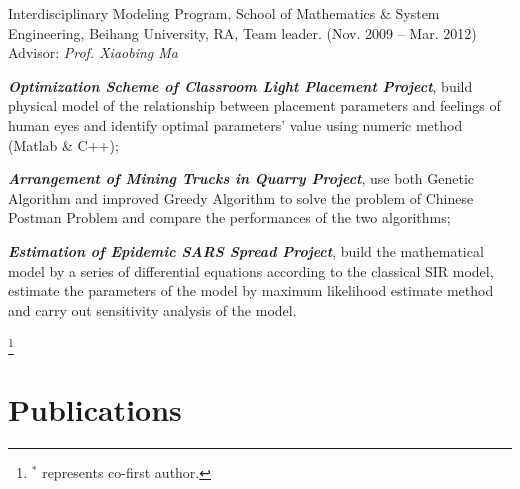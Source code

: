 \documentclass[10pt,letterpaper]{article}
\renewenvironment{itemize}{
  \begin{list}{}{
    \setlength{\leftmargin}{1.5em}
    \setlength{\itemsep}{0.25em}
    \setlength{\parskip}{0pt}
    \setlength{\parsep}{0.25em}
  }
}{
  \end{list}
}
\begin{document}
\begin{itemize}
  \item Interdisciplinary Modeling Program, School of Mathematics \& System Engineering, Beihang University, RA, Team leader. (Nov. 2009 -- Mar. 2012) \\
    Advisor: \textit{Prof. Xiaobing Ma}
  \begin{itemize}
    \item \textbf{\textit{Optimization Scheme of Classroom Light Placement Project}}, build physical model of the relationship between placement parameters and feelings of human eyes and identify optimal parameters' value using numeric method (Matlab \& C++);
    \item \textit{\textbf{Arrangement of Mining Trucks in Quarry Project}}, use both Genetic Algorithm and improved Greedy Algorithm to solve the problem of Chinese Postman Problem and compare the performances of the two algorithms;
    \item \textbf{\textit{Estimation of Epidemic SARS Spread Project}}, build the mathematical model by a series of differential equations according to the classical SIR model, estimate the parameters of the model by maximum likelihood estimate method and carry out sensitivity analysis of the model.
  \end{itemize}
\end{itemize}

\newpage
\let\thefootnote\relax\footnote{$^*$ represents co-first author.}

\section*{Publications}
\end{document}
